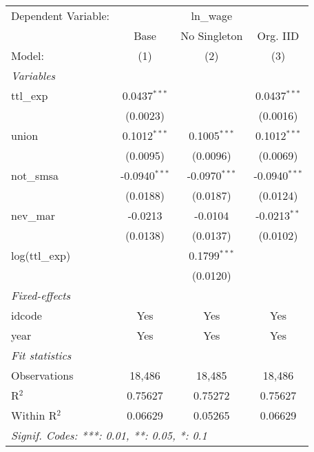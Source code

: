 \begingroup
\centering
\begin{tabular}{lccc}
   \tabularnewline \midrule \midrule
   Dependent Variable: & \multicolumn{3}{c}{ln\_wage}\\
                  & Base            & No Singleton    & Org. IID \\   
   Model:         & (1)             & (2)             & (3)\\  
   \midrule
   \emph{Variables}\\
   ttl\_exp       & 0.0437$^{***}$  &                 & 0.0437$^{***}$\\   
                  & (0.0023)        &                 & (0.0016)\\   
   union          & 0.1012$^{***}$  & 0.1005$^{***}$  & 0.1012$^{***}$\\   
                  & (0.0095)        & (0.0096)        & (0.0069)\\   
   not\_smsa      & -0.0940$^{***}$ & -0.0970$^{***}$ & -0.0940$^{***}$\\   
                  & (0.0188)        & (0.0187)        & (0.0124)\\   
   nev\_mar       & -0.0213         & -0.0104         & -0.0213$^{**}$\\   
                  & (0.0138)        & (0.0137)        & (0.0102)\\   
   log(ttl\_exp)  &                 & 0.1799$^{***}$  &   \\   
                  &                 & (0.0120)        &   \\   
   \midrule
   \emph{Fixed-effects}\\
   idcode         & Yes             & Yes             & Yes\\  
   year           & Yes             & Yes             & Yes\\  
   \midrule
   \emph{Fit statistics}\\
   Observations   & 18,486          & 18,485          & 18,486\\  
   R$^2$          & 0.75627         & 0.75272         & 0.75627\\  
   Within R$^2$   & 0.06629         & 0.05265         & 0.06629\\  
   \midrule \midrule
   \multicolumn{4}{l}{\emph{Signif. Codes: ***: 0.01, **: 0.05, *: 0.1}}\\
\end{tabular}
\par\endgroup


